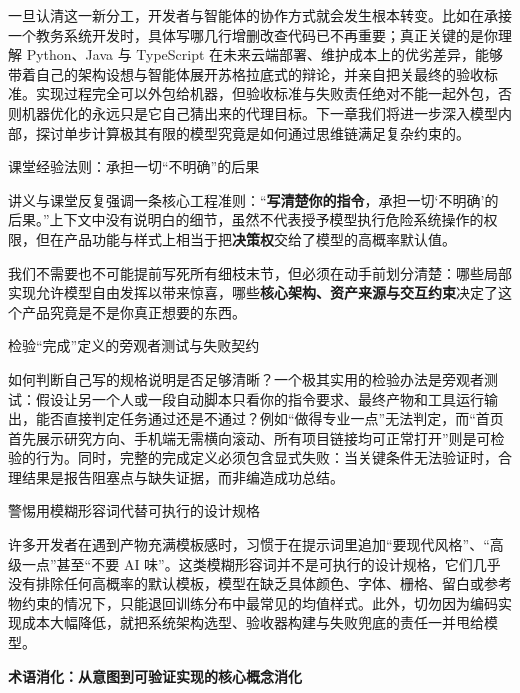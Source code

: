 \documentclass[UTF8,a4paper,11pt,fontset=fandol]{ctexart}
\begin{document}
一旦认清这一新分工，开发者与智能体的协作方式就会发生根本转变。比如在承接一个教务系统开发时，具体写哪几行增删改查代码已不再重要；真正关键的是你理解 Python、Java 与 TypeScript 在未来云端部署、维护成本上的优劣差异，能够带着自己的架构设想与智能体展开苏格拉底式的辩论，并亲自把关最终的验收标准。实现过程完全可以外包给机器，但验收标准与失败责任绝对不能一起外包，否则机器优化的永远只是它自己猜出来的代理目标。下一章我们将进一步深入模型内部，探讨单步计算极其有限的模型究竟是如何通过思维链满足复杂约束的。

\begin{importantbox}{课堂经验法则：承担一切“不明确”的后果}

讲义与课堂反复强调一条核心工程准则：“\textbf{写清楚你的指令}，承担一切‘不明确’的后果。”上下文中没有说明白的细节，虽然不代表授予模型执行危险系统操作的权限，但在产品功能与样式上相当于把\textbf{决策权}交给了模型的高概率默认值。

我们不需要也不可能提前写死所有细枝末节，但必须在动手前划分清楚：哪些局部实现允许模型自由发挥以带来惊喜，哪些\textbf{核心架构、资产来源与交互约束}决定了这个产品究竟是不是你真正想要的东西。

\end{importantbox}

\begin{knowledgebox}{检验“完成”定义的旁观者测试与失败契约}

如何判断自己写的规格说明是否足够清晰？一个极其实用的检验办法是旁观者测试：假设让另一个人或一段自动脚本只看你的指令要求、最终产物和工具运行输出，能否直接判定任务通过还是不通过？例如“做得专业一点”无法判定，而“首页首先展示研究方向、手机端无需横向滚动、所有项目链接均可正常打开”则是可检验的行为。同时，完整的完成定义必须包含显式失败：当关键条件无法验证时，合理结果是报告阻塞点与缺失证据，而非编造成功总结。

\end{knowledgebox}

\begin{warningbox}{警惕用模糊形容词代替可执行的设计规格}

许多开发者在遇到产物充满模板感时，习惯于在提示词里追加“要现代风格”、“高级一点”甚至“不要 AI 味”。这类模糊形容词并不是可执行的设计规格，它们几乎没有排除任何高概率的默认模板，模型在缺乏具体颜色、字体、栅格、留白或参考物约束的情况下，只能退回训练分布中最常见的均值样式。此外，切勿因为编码实现成本大幅降低，就把系统架构选型、验收器构建与失败兜底的责任一并甩给模型。

\end{warningbox}

\par{}\textbf{术语消化：从意图到可验证实现的核心概念消化}
\end{document}
